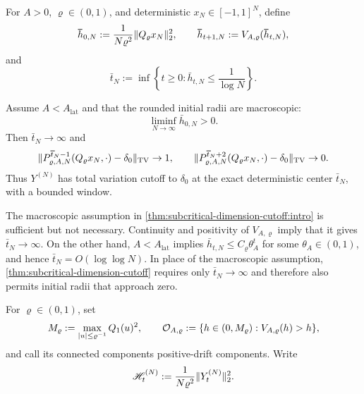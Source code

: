 \documentclass[11pt,reqno,a4paper]{article}
\newcommand{\TV}{\mathrm{TV}}
\begin{document}
For $A>0$, $\varrho\in(0,1)$, and deterministic
$x_N\in[-1,1]^N$, define
\begin{equation*}
  \bar h_{0,N}:=\frac1{N\varrho^2}\norm{Q_\varrho x_N}_2^2,
  \qquad
  \bar h_{t+1,N}:=V_{A,\varrho}(\bar h_{t,N}),
\end{equation*}
and
\begin{equation*}
  \bar t_N
  :=
  \inf\left\{t\geq0:\bar h_{t,N}\leq\frac1{\log N}\right\}.
\end{equation*}

\begin{theorem}
\label{thm:subcritical-dimension-cutoff:intro}
  Assume $A<A_{\mathrm{lat}}$ and that the rounded initial radii are
  macroscopic:
  \begin{equation*}
    \liminf_{N\to\infty}\bar h_{0,N}>0 .
  \end{equation*}
  Then $\bar t_N\to\infty$ and
  \begin{equation*}
    \norm{
      P_{\varrho,A,N}^{\bar t_N-1}
      (Q_\varrho x_N,\cdot)-\delta_0
    }_{\TV}
    \to1,
    \qquad
    \norm{
      P_{\varrho,A,N}^{\bar t_N+2}
      (Q_\varrho x_N,\cdot)-\delta_0
    }_{\TV}
    \to0 .
  \end{equation*}
  Thus $Y^{(N)}$ has total variation cutoff to $\delta_0$
  at the exact deterministic center $\bar t_N$, with a bounded
  window.
\end{theorem}

\begin{remark}
\label{rem:subcritical-macroscopic-intro}
  The macroscopic assumption in
  \cref{thm:subcritical-dimension-cutoff:intro} is sufficient but not
  necessary. Continuity and positivity of $V_{A,\varrho}$ imply that it gives
  $\bar t_N\to\infty$. On the other hand, $A<A_{\mathrm{lat}}$ implies
  $\bar h_{t,N}\leq C_\varrho\theta_A^t$ for some $\theta_A\in(0,1)$, and
  hence $\bar t_N=O(\log\log N)$. In place of the macroscopic assumption,
  \cref{thm:subcritical-dimension-cutoff} requires only
  $\bar t_N\to\infty$ and therefore also permits initial radii that approach
  zero.
\end{remark}

For $\varrho\in(0,1)$, set
\begin{equation*}
  M_\varrho
  :=
  \max_{\abs u\leq\varrho^{-1}} Q_1(u)^2,
  \qquad
  \mathcal O_{A,\varrho}
  :=
  \{h\in(0,M_\varrho):V_{A,\varrho}(h)>h\},
\end{equation*}
and call its connected components positive-drift components.
Write
\begin{equation*}
  \mathscr H_t^{(N)}
  :=
  \frac1{N\varrho^2}\lVert Y_t^{(N)}\rVert_2^2.
\end{equation*}
\end{document}
